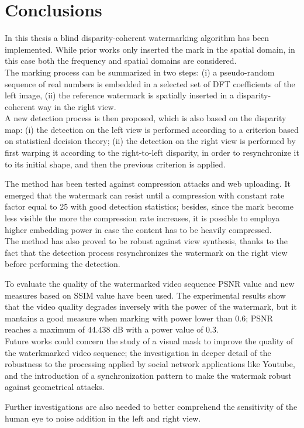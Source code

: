 \chapter{Conclusions}
\label{concl}

In this thesis a blind disparity-coherent watermarking algorithm has been implemented. While prior works only inserted the mark in the spatial domain, in this case both the frequency and spatial domains are considered. \\
The marking process can be summarized in two steps: (i) a pseudo-random sequence of real numbers is embedded in a selected set of DFT coefficients of the left image, (ii) the reference watermark is spatially inserted in a disparity-coherent way in the right view.\\ 
A new detection process is then proposed, which is also based on the disparity map: (i) the detection on the left view is performed according to a criterion based on statistical decision theory; (ii) the detection on the right view is performed by first warping it according to the right-to-left disparity, in order to resynchronize it to its initial shape, and then the previous criterion is applied.
 
The method has been tested against compression attacks and web uploading. It emerged that the watermark can resist until a compression with constant rate factor equal to 25 with good detection statistics; besides, since the mark become less visible the more the compression rate increases, it is possible to employa higher embedding power in case the content has to be heavily compressed.\\

The method has also proved to be robust against view synthesis, thanks to the fact that the detection process resynchronizes the watermark on the right view before performing the detection.

To evaluate the quality of the watermarked video sequence PSNR value and new measures based on SSIM value have been used. The experimental results show that the video quality degrades inversely with the power of the watermark, but it mantains a good measure when marking with power lower than 0.6; PSNR reaches a maximum of  $44.438$ dB with a power value of $0.3$.\\

Future works could concern the study of a visual mask to improve the quality of the waterkmarked video sequence; the investigation in deeper detail of the robustness to the processing applied by social network applications like Youtube, and the introduction of a synchronization pattern to make the watermak robust against geometrical attacks. 

Further investigations are also needed to better comprehend the sensitivity of the human eye to noise addition in the left and right view.



